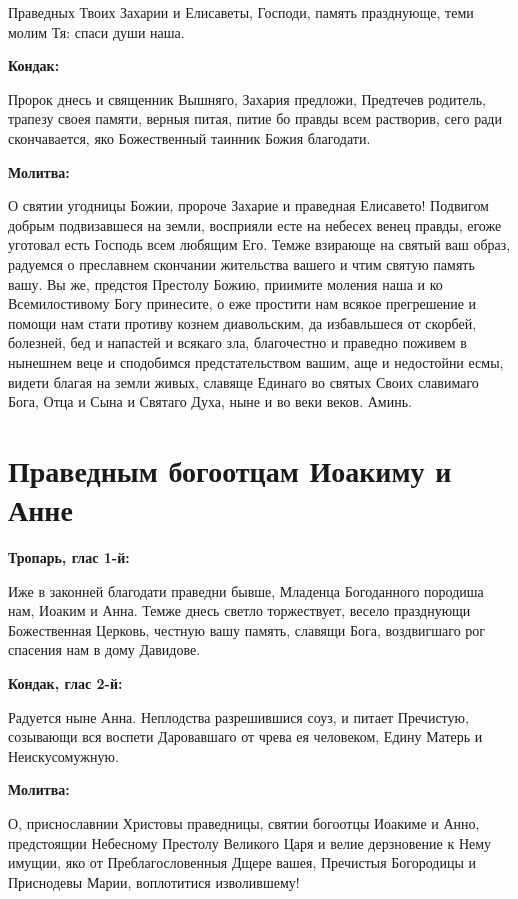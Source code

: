 Праведных Твоих Захарии и Елисаветы, Господи, память празднующе, теми молим Тя: спаси души наша.


\medskip
\bfseries Кондак:\normalfont{}


Пророк днесь и священник Вышняго, Захария предложи, Предтечев родитель, трапезу своея памяти, верныя питая, питие бо правды всем растворив, сего ради скончавается, яко Божественный таинник Божия благодати.


\medskip
\bfseries Молитва:\normalfont{}


О святии угодницы Божии, пророче Захарие и праведная Елисавето! Подвигом добрым подвизавшеся на земли, восприяли есте на небесех венец правды, егоже уготовал есть Господь всем любящим Его. Темже взирающе на святый ваш образ, радуемся о преславнем скончании жительства вашего и чтим святую память вашу. Вы же, предстоя Престолу Божию, приимите моления наша и ко Всемилостивому Богу принесите, о еже простити нам всякое прегрешение и помощи нам стати противу кознем диавольским, да избавльшеся от скорбей, болезней, бед и напастей и всякаго зла, благочестно и праведно поживем в нынешнем веце и сподобимся предстательством вашим, аще и недостойни есмы, видети благая на земли живых, славяще Единаго во святых Своих славимаго Бога, Отца и Сына и Святаго Духа, ныне и во веки веков. Аминь.

\newpage\section{Праведным богоотцам Иоакиму и Анне}
 
\bfseries Тропарь, глас 1-й:\normalfont{}


Иже в законней благодати праведни бывше, Младенца Богоданного породиша нам, Иоаким и Анна. Темже днесь светло торжествует, весело празднующи Божественная Церковь, честную вашу память, славящи Бога, воздвигшаго рог спасения нам в дому Давидове.


\medskip
\bfseries Кондак, глас 2-й:\normalfont{}


Радуется ныне Анна. Неплодства разрешившися соуз, и питает Пречистую, созывающи вся воспети Даровавшаго от чрева ея человеком, Едину Матерь и Неискусомужную.


\medskip
\bfseries Молитва:\normalfont{}


О, приснославнии Христовы праведницы, святии богоотцы Иоакиме и Анно, предстоящии Небесному Престолу Великого Царя и велие дерзновение к Нему имущии, яко от Преблагословенныя Дщере вашея, Пречистыя Богородицы и Приснодевы Марии, воплотитися изволившему!

